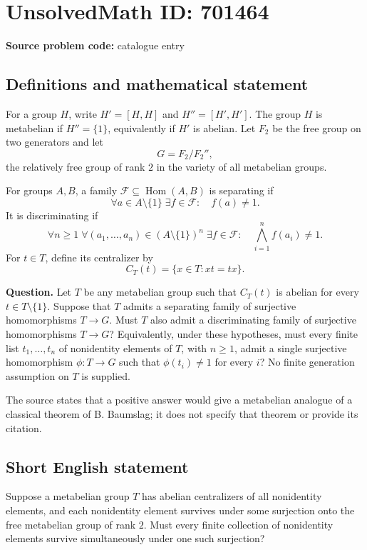 \documentclass[11pt]{article}
\begin{document}
\section*{UnsolvedMath ID: 701464}
\textbf{Source problem code:} catalogue entry
\subsection{Definitions and mathematical statement}
For a group \(H\), write \(H'=[H,H]\) and \(H''=[H',H']\). The group \(H\) is metabelian if \(H''=\{1\}\), equivalently if \(H'\) is abelian. Let \(F_2\) be the free group on two generators and let
\[
G=F_2/F_2'',
\]
the relatively free group of rank \(2\) in the variety of all metabelian groups.

For groups \(A,B\), a family \(\mathscr F\subseteq\operatorname{Hom}(A,B)\) is separating if
\[
\forall a\in A\setminus\{1\}\;\exists f\in\mathscr F:\quad f(a)\ne1.
\]
It is discriminating if
\[
\forall n\ge1\;\forall(a_1,\ldots,a_n)\in(A\setminus\{1\})^n\;\exists f\in\mathscr F:\quad
\bigwedge_{i=1}^{n}f(a_i)\ne1.
\]
For \(t\in T\), define its centralizer by
\[
C_T(t)=\{x\in T:xt=tx\}.
\]

\textbf{Question.} Let \(T\) be any metabelian group such that \(C_T(t)\) is abelian for every \(t\in T\setminus\{1\}\). Suppose that \(T\) admits a separating family of surjective homomorphisms \(T\to G\). Must \(T\) also admit a discriminating family of surjective homomorphisms \(T\to G\)? Equivalently, under these hypotheses, must every finite list \(t_1,\ldots,t_n\) of nonidentity elements of \(T\), with \(n\ge1\), admit a single surjective homomorphism \(\phi:T\to G\) such that \(\phi(t_i)\ne1\) for every \(i\)? No finite generation assumption on \(T\) is supplied.

The source states that a positive answer would give a metabelian analogue of a classical theorem of B. Baumslag; it does not specify that theorem or provide its citation.
\subsection{Short English statement}
Suppose a metabelian group \(T\) has abelian centralizers of all nonidentity elements, and each nonidentity element survives under some surjection onto the free metabelian group of rank \(2\). Must every finite collection of nonidentity elements survive simultaneously under one such surjection?
\end{document}
